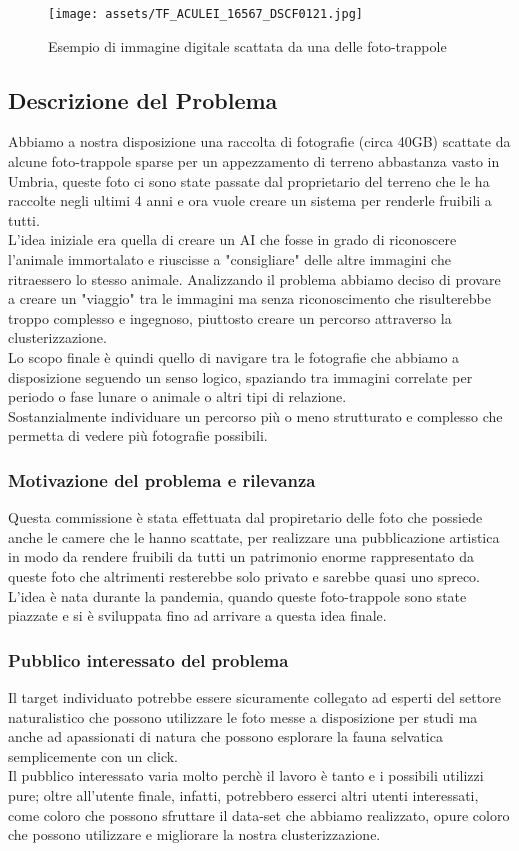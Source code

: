 \documentclass[12pt,a4paper,twoside]{article}
\begin{document}
\begin{figure}[h!]
    \centering
    \texttt{[image: assets/TF\_ACULEI\_16567\_DSCF0121.jpg]}
    \caption{Esempio di immagine digitale scattata da una delle foto-trappole}
    \label{fig:enter-label}
\end{figure}

\subsection{Descrizione del Problema}
Abbiamo a nostra disposizione una raccolta di fotografie (circa 40GB) scattate da alcune foto-trappole 
sparse per un appezzamento di terreno abbastanza vasto in Umbria, queste foto ci sono state passate dal 
proprietario del terreno che le ha raccolte negli ultimi 4 anni e ora vuole creare un sistema per 
renderle fruibili a tutti.\\
L'idea iniziale era quella di creare un AI che fosse in grado di riconoscere l'animale immortalato e 
riuscisse a "consigliare" delle altre immagini che ritraessero lo stesso animale. Analizzando il problema 
abbiamo deciso di provare a creare un "viaggio" tra le immagini ma senza riconoscimento che risulterebbe 
troppo complesso e ingegnoso, piuttosto creare un percorso attraverso la clusterizzazione.\\ 
Lo scopo finale è quindi quello di navigare tra le fotografie che abbiamo a disposizione seguendo un 
senso logico, spaziando tra immagini correlate per periodo o fase lunare o animale o altri tipi di 
relazione.\\
Sostanzialmente individuare un percorso più o meno strutturato e complesso che permetta di vedere più 
fotografie possibili.
\subsubsection{Motivazione del problema e rilevanza}
Questa commissione è stata effettuata dal propiretario delle foto che possiede anche le camere che le hanno
scattate, per realizzare una pubblicazione artistica in modo da rendere fruibili da tutti un patrimonio 
enorme rappresentato da queste foto che altrimenti resterebbe solo privato e sarebbe quasi uno spreco.\\
L'idea è nata durante la pandemia, quando queste foto-trappole sono state piazzate e si è sviluppata fino ad 
arrivare a questa idea finale.
\subsubsection{Pubblico interessato del problema}
Il target individuato potrebbe essere sicuramente collegato ad esperti del settore naturalistico che possono 
utilizzare le foto messe a disposizione per studi ma anche ad apassionati di natura che possono esplorare 
la fauna selvatica semplicemente con un click.\\
Il pubblico interessato varia molto perchè il lavoro è tanto e i possibili utilizzi pure; oltre all'utente 
finale, infatti, potrebbero esserci altri utenti interessati, come coloro che possono sfruttare il data-set 
che abbiamo realizzato, opure coloro che possono utilizzare e migliorare la nostra clusterizzazione.
\end{document}
